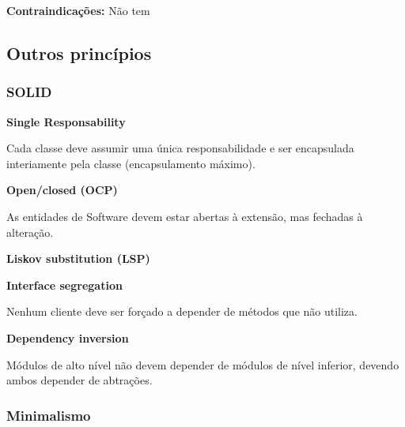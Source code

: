 \documentclass{article}
\begin{document}
\begin{flushleft}
    \textbf{Contraindicações:} Não tem
\end{flushleft}

\subsection{Outros princípios}

\subsubsection{SOLID}

\vspace{3mm}
\begin{flushleft}
    \textbf{Single Responsability}
\end{flushleft}

Cada classe deve assumir uma única responsabilidade e ser encapsulada interiamente pela classe
(encapsulamento máximo).

\vspace{2mm}
\begin{flushleft}
    \textbf{Open/closed (OCP)}
\end{flushleft}

As entidades de Software devem estar abertas à extensão, mas fechadas à alteração.

\vspace{2mm}
\begin{flushleft}
    \textbf{Liskov substitution (LSP)}
\end{flushleft}

\pagebreak

\begin{flushleft}
    \textbf{Interface segregation}
\end{flushleft}

Nenhum cliente deve ser forçado a depender de métodos que não utiliza.

\vspace{2mm}
\begin{flushleft}
    \textbf{Dependency inversion}
\end{flushleft}

Módulos de alto nível não devem depender de módulos de nível inferior, devendo
ambos depender de abtrações.

\subsubsection{Minimalismo}
\end{document}
